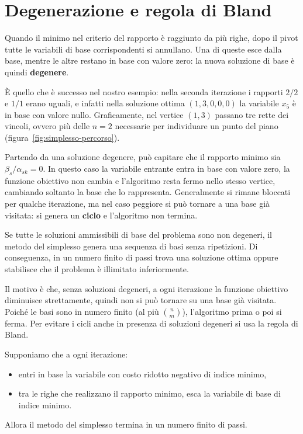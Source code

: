 \section{Degenerazione e regola di Bland}\label{sec:bland}
Quando il minimo nel criterio del rapporto è raggiunto da più righe, dopo il pivot tutte le variabili di base corrispondenti si annullano. Una di queste esce dalla base, mentre le altre restano in base con valore zero: la nuova soluzione di base è quindi \textbf{degenere}.

È quello che è successo nel nostro esempio: nella seconda iterazione i rapporti $2/2$ e $1/1$ erano uguali, e infatti nella soluzione ottima $(1, 3, 0, 0, 0)$ la variabile $x_5$ è in base con valore nullo. Graficamente, nel vertice $(1, 3)$ passano tre rette dei vincoli, ovvero più delle $n = 2$ necessarie per individuare un punto del piano (figura~\ref{fig:simplesso-percorso}).

Partendo da una soluzione degenere, può capitare che il rapporto minimo sia $\beta_s / \alpha_{sk} = 0$. In questo caso la variabile entrante entra in base con valore zero, la funzione obiettivo non cambia e l'algoritmo resta fermo nello stesso vertice, cambiando soltanto la base che lo rappresenta. Generalmente si rimane bloccati per qualche iterazione, ma nel caso peggiore si può tornare a una base già visitata: si genera un \textbf{ciclo} e l'algoritmo non termina.

\begin{teorema}[Convergenza]\label{teo:convergenza}
Se tutte le soluzioni ammissibili di base del problema sono non degeneri, il metodo del simplesso genera una sequenza di basi senza ripetizioni. Di conseguenza, in un numero finito di passi trova una soluzione ottima oppure stabilisce che il problema è illimitato inferiormente.
\end{teorema}

Il motivo è che, senza soluzioni degeneri, a ogni iterazione la funzione obiettivo diminuisce strettamente, quindi non si può tornare su una base già visitata. Poiché le basi sono in numero finito (al più $\binom{n}{m}$), l'algoritmo prima o poi si ferma. Per evitare i cicli anche in presenza di soluzioni degeneri si usa la regola di Bland.

\begin{teorema}\label{teo:bland}
Supponiamo che a ogni iterazione:
\begin{itemize}
    \item entri in base la variabile con costo ridotto negativo di indice minimo,
    \item tra le righe che realizzano il rapporto minimo, esca la variabile di base di indice minimo.
\end{itemize}
Allora il metodo del simplesso termina in un numero finito di passi.
\end{teorema}

